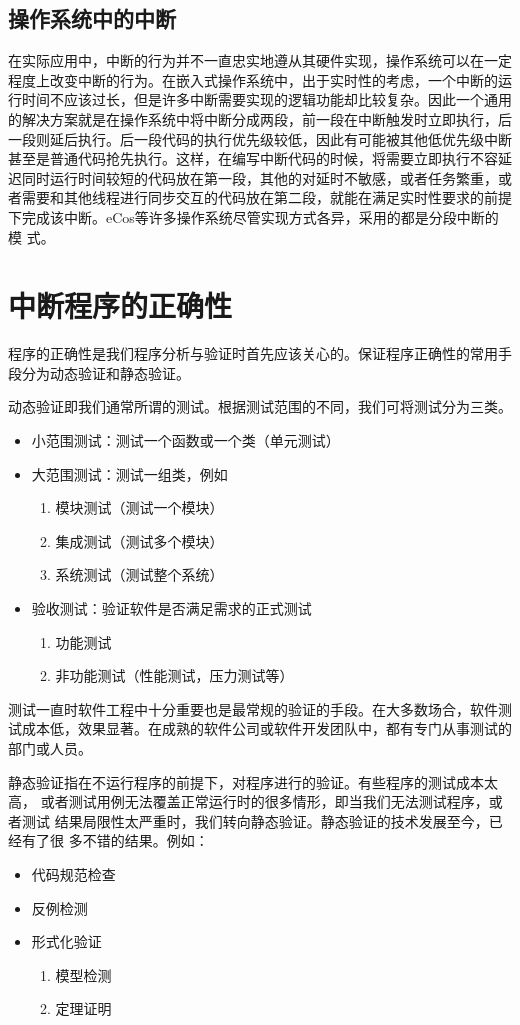 \subsection{操作系统中的中断}
在实际应用中，中断的行为并不一直忠实地遵从其硬件实现，操作系统可以在一定
程度上改变中断的行为。在嵌入式操作系统中，出于实时性的考虑，一个中断的运
行时间不应该过长，但是许多中断需要实现的逻辑功能却比较复杂。因此一个通用
的解决方案就是在操作系统中将中断分成两段，前一段在中断触发时立即执行，后
一段则延后执行。后一段代码的执行优先级较低，因此有可能被其他低优先级中断
甚至是普通代码抢先执行。这样，在编写中断代码的时候，将需要立即执行不容延
迟同时运行时间较短的代码放在第一段，其他的对延时不敏感，或者任务繁重，或
者需要和其他线程进行同步交互的代码放在第二段，就能在满足实时性要求的前提
下完成该中断。eCos等许多操作系统尽管实现方式各异，采用的都是分段中断的模
式。\cite{ecos}

\section{中断程序的正确性}
程序的正确性是我们程序分析与验证时首先应该关心的。保证程序正确性的常用手
段分为动态验证和静态验证。

动态验证即我们通常所谓的测试。根据测试范围的不同，我们可将测试分为三类。
\cite{SWEBOK}
\begin{itemize}
	\item 小范围测试：测试一个函数或一个类（单元测试）
	\item 大范围测试：测试一组类，例如
	\begin{enumerate}[(1)]
		\item 模块测试（测试一个模块）
		\item 集成测试（测试多个模块）
		\item 系统测试（测试整个系统）
	\end{enumerate}
	\item 验收测试：验证软件是否满足需求的正式测试
	\begin{enumerate}[(1)]
		\item 功能测试
		\item 非功能测试（性能测试，压力测试等）
	\end{enumerate}		
\end{itemize}
测试一直时软件工程中十分重要也是最常规的验证的手段。在大多数场合，软件测
试成本低，效果显著。在成熟的软件公司或软件开发团队中，都有专门从事测试的
部门或人员。

静态验证指在不运行程序的前提下，对程序进行的验证。有些程序的测试成本太高，
或者测试用例无法覆盖正常运行时的很多情形，即当我们无法测试程序，或者测试
结果局限性太严重时，我们转向静态验证。静态验证的技术发展至今，已经有了很
多不错的结果。例如：
\begin{itemize}
	\item 代码规范检查
	\item 反例检测
	\item 形式化验证
	\begin{enumerate}[(1)]
		\item 模型检测
		\item 定理证明
	\end{enumerate}	
\end{itemize}



